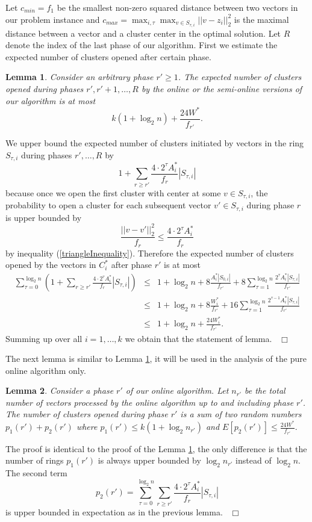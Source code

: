 \documentclass{article}
\newtheorem{lemma}{Lemma}
\newenvironment{proof}{\medskip\noindent {\bf Proof.}}{~\hfill$\Box$\medskip}
\begin{document}
Let $c_{min}=f_1$ be the smallest non-zero squared distance between two vectors in our problem instance  and $c_{max}=\max_{i,\tau}\max_{v\in S_{\tau,i}} ||v-z_i||^2_2$ is the maximal distance between a vector and a cluster center in the optimal solution. Let $R$ denote the index of the last phase of our algorithm.
First we estimate the expected number of clusters opened after certain phase.
\begin{lemma}\label{expected}
Consider an arbitrary phase $r'\ge 1$. The expected number of clusters opened during phases $r',r'+1,\dots,R$  by the online or the semi-online versions of our algorithm is at most
$$k(1+\log_2n) +\frac{24W^*}{f_{r'}}.$$ 
\end{lemma}
\begin{proof}
We upper bound the expected number of clusters initiated by vectors in the ring $S_{\tau,i}$ during phases $r',\dots,R$ by 
$$1+\sum_{r\ge r'}\frac{4\cdot 2^{\tau}A^*_i}{f_r}|S_{\tau,i}|$$
because once we open the first cluster with center at some   $v\in S_{\tau,i}$, the probability to open a cluster for each subsequent vector  $v'\in S_{\tau,i}$ during phase $r$ is upper bounded by 
$$\frac{||v-v'||^2_2}{f_r}\le \frac{4\cdot 2^{\tau}A^*_i}{f_r}$$
 by inequality (\ref{triangleInequality}).
Therefore the expected number of clusters opened by the vectors in $C^*_i$ after phase $r'$ is at most
\begin{eqnarray*}
\sum_{\tau=0}^{\log_2 n}\left(1+\sum_{r\ge r'}\frac{4\cdot 2^{\tau} A^*_i}{f_r}|S_{\tau,i}|\right)&\le &1+\log_2 n+8\frac{A^*_i|S_{0,i}|}{f_{r'}}+8\sum_{\tau=1}^{\log_2 n} \frac{2^{\tau}A^*_i|S_{\tau,i}|}{f_{r'}}\\
&\le &1+\log_2 n+8\frac{W^*_i}{f_{r'}}+16\sum_{\tau=1}^{\log_2 n} \frac{2^{\tau-1}A^*_i|S_{\tau,i}|}{f_{r'}}\\
&\le&1+ \log_2 n +\frac{24W^*_i}{f_{r'}}.
\end{eqnarray*}
Summing up over all $i=1,\dots, k$ we obtain that the statement of lemma.
\end{proof}

The next lemma is similar to Lemma \ref{expected}, it will be used in the analysis of the pure online algorithm only.
\begin{lemma}\label{expected1}
Consider a phase $r'$ of our online algorithm. Let $n_{r'}$ be the total number of vectors processed by the online algorithm up to and including phase $r'$. The  number of clusters opened during phase $r'$ is a sum of two random numbers $p_1(r')+p_2(r')$ where $p_1(r')\le k(1+\log_2n_{r'})$ and $E[p_2(r')]\le \frac{24W^*}{f_{r'}}.$
\end{lemma}
\begin{proof}
The proof is identical to the proof of the Lemma \ref{expected}, the only difference is that the number of rings $p_1(r')$ is always upper bounded by $ \log_2n_{r'}$ instead of $\log_2n$. The second term 
$$p_2(r')= \sum_{\tau=0}^{\log_2 n}\sum_{r\ge r'}\frac{4\cdot 2^{\tau} A^*_i}{f_r}|S_{\tau,i}|$$
 is upper bounded in expectation as in the previous lemma.
\end{proof}
\end{document}

